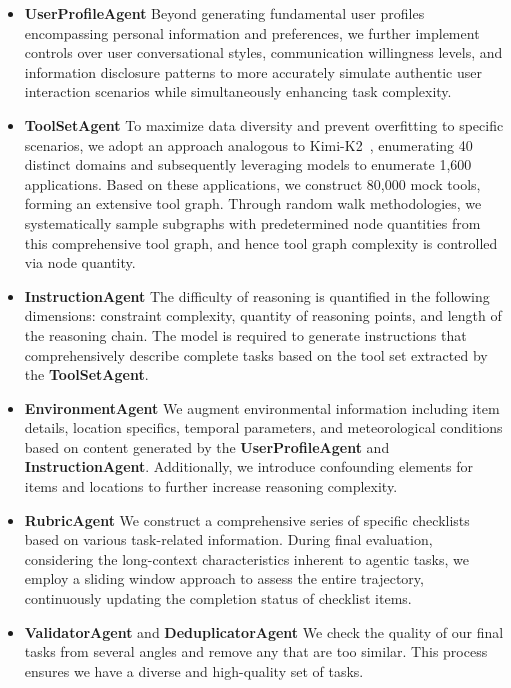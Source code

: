 \documentclass{article}
\begin{document}
\begin{itemize}
\item \textbf{UserProfileAgent} Beyond generating fundamental user profiles encompassing personal information and preferences, we further implement controls over user conversational styles, communication willingness levels, and information disclosure patterns to more accurately simulate authentic user interaction scenarios while simultaneously enhancing task complexity.

\item \textbf{ToolSetAgent} To maximize data diversity and prevent overfitting to specific scenarios, we adopt an approach analogous to Kimi-K2~\citep{team2025kimi}, enumerating 40 distinct domains and subsequently leveraging models to enumerate 1,600 applications. Based on these applications, we construct 80,000 mock tools, forming an extensive tool graph. Through random walk methodologies, we systematically sample subgraphs with predetermined node quantities from this comprehensive tool graph, and hence tool graph complexity is controlled via node quantity.

\item \textbf{InstructionAgent} The difficulty of reasoning is quantified in the following dimensions: constraint complexity, quantity of reasoning points, and length of the reasoning chain. The model is required to generate instructions that comprehensively describe complete tasks based on the tool set extracted by the \textbf{ToolSetAgent}.

\item \textbf{EnvironmentAgent} We augment environmental information including item details, location specifics, temporal parameters, and meteorological conditions based on content generated by the \textbf{UserProfileAgent} and \textbf{InstructionAgent}. Additionally, we introduce confounding elements for items and locations to further increase reasoning complexity.

\item \textbf{RubricAgent} We construct a comprehensive series of specific checklists based on various task-related information. During final evaluation, considering the long-context characteristics inherent to agentic tasks, we employ a sliding window approach to assess the entire trajectory, continuously updating the completion status of checklist items.

\item \textbf{ValidatorAgent} and \textbf{DeduplicatorAgent} We check the quality of our final tasks from several angles and remove any that are too similar. This process ensures we have a diverse and high-quality set of tasks.
\end{itemize}
\end{document}
